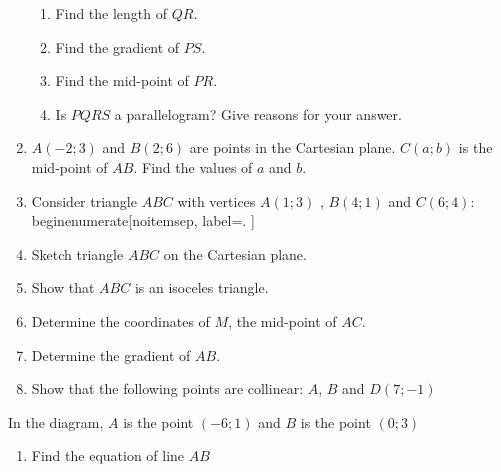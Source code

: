 \begin{eocexercises}{}
\begin{enumerate}[noitemsep, label=\textbf{\arabic*}. ]
\begin{enumerate}[noitemsep, label=\textbf{\alph*}. ] 
\item Find the length of $QR$.
\item Find the gradient of $PS$.
\item Find the mid-point of $PR$.
\item Is $PQRS$ a parallelogram?  Give reasons for your answer.
 \end{enumerate}
\item $A(-2;3)$ and $B(2;6)$ are points in the Cartesian plane. $C(a;b)$ is the mid-point of $AB$. Find the values of $a$ and $b$.
\item 
Consider triangle $ABC$ with vertices $A(1; 3)$ , $B(4;1)$ and $C (6; 4)$:
\\begin{enumerate}[noitemsep, label=\textbf{\alph*}. ] 
\item Sketch triangle $ABC$ on the Cartesian plane. 
\item Show that $ABC$ is an isoceles triangle.
\item Determine the coordinates of $M$, the mid-point of $AC$.
\item Determine the gradient of $AB$.
\item Show that the following points are collinear: $A$, $B$ and $D(7;-1)$
\end{enumerate}
\item In the diagram, $A$ is the point $(-6;1)$ and $B$ is the point $(0;3)$
\setcounter{subfigure}{0}
\begin{figure}[H] %
\begin{center}
\end{center}
\end{figure} 
\begin{enumerate}[noitemsep, label=\textbf{\alph*}. ] 
\item Find the equation of line $AB$ 

\end{enumerate}
\end{eocexercises}
